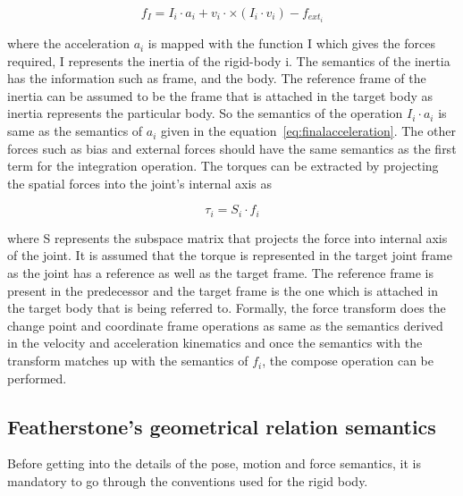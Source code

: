 \begin{equation}
f_I = I_i\cdot a_i + v_i\cdot \times (I_i\cdot v_i) - f_{{ext}_i}
\end{equation}

where the acceleration $a_i$ is mapped with the function I which gives the forces required, I represents the inertia of the rigid-body i. The semantics of the inertia has the information such as frame, and the body. The reference frame of the inertia can be assumed to be the frame that is  attached in the target body as inertia represents the particular body. So the semantics of the operation $I_i\cdot a_i$ is same as the semantics of $a_i$ given in the equation~\eqref{eq:finalacceleration}. The other forces such as bias and external forces should have the same semantics as the first term for the integration operation. The torques can be extracted by projecting the spatial forces into the joint's internal axis as 

\begin{equation}
\tau_i = S_i\cdot f_i
\end{equation}

where S represents the subspace matrix that projects the force into internal axis of the joint. It is assumed that the torque is represented in the target joint frame as the joint has a reference as well as the target frame. The reference frame is present in the predecessor and the target frame is the one which is attached in the target body that is being referred to. Formally, the force transform does the change point and coordinate frame operations as same as the semantics derived in the velocity and acceleration kinematics and once the semantics with the transform matches up with the semantics of $f_i$, the compose operation can be performed.

\subsection{Featherstone's geometrical relation semantics}

Before getting into the details of the pose, motion and force semantics, it is mandatory to go through the conventions used for the rigid body.

